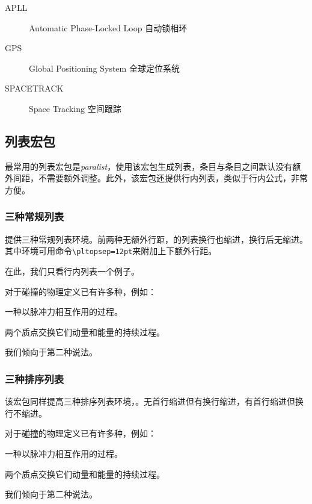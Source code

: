 \begin{codeshow}
	\begin{description}
		\item[APLL] 
		Automatic Phase-Locked Loop
		自动锁相环
		\item[GPS] Global 
		Positioning System 全球定位系统
		\item[SPACETRACK] 
		Space Tracking 空间跟踪
	\end{description}
\end{codeshow}

\subsection{列表宏包}
最常用的列表宏包是\emph{paralist}，使用该宏包生成列表，条目与条目之间默认没有额外间距，不需要额外调整。此外，该宏包还提供行内列表，类似于行内公式，非常方便。

\subsubsection{三种常规列表}
提供三种常规列表环境。前两种无额外行距，的列表换行也缩进，换行后无缩进。其中环境可用命令\verb|\pltopsep=12pt|来附加上下额外行距。

在此，我们只看行内列表一个例子。

\begin{codeshow}
	对于碰撞的物理定义已有许多种，例如：
	\begin{inparaitem}[\S]
		\item 一种以脉冲力相互作用的过程。
		\item 两个质点交换它们动量和能量的持续过程。
	\end{inparaitem}
	我们倾向于第二种说法。
\end{codeshow}

\subsubsection{三种排序列表}
该宏包同样提高三种排序列表环境，。无首行缩进但有换行缩进，有首行缩进但换行不缩进。

\begin{codeshow}
	对于碰撞的物理定义已有许多种，例如：
	\begin{compactenum}[(1)]
		\item 一种以脉冲力相互作用的过程。
		\item 两个质点交换它们动量和能量的持续过程。
	\end{compactenum}
	我们倾向于第二种说法。
\end{codeshow}


